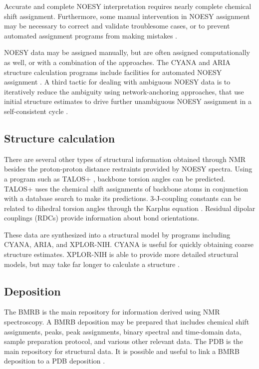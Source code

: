 Accurate and complete NOESY interpretation requires nearly complete chemical
shift assignment.  Furthermore, some manual intervention in NOESY assignment
may be necessary to correct and validate troublesome cases, or to prevent
automated assignment programs from making mistakes 
\cite{guntert2009automated, guerry2011automated}.

NOESY data may be assigned manually, but are often assigned computationally
as well, or with a combination of the approaches.  The CYANA and ARIA structure 
calculation programs include facilities for automated NOESY assignment
\cite{cyana2004, aria2003}.  
A third tactic for dealing with ambiguous NOESY data is to iteratively reduce the
ambiguity using network-anchoring approaches, that use initial structure 
estimates to drive further unambiguous NOESY assignment in a self-consistent
cycle \cite{cyana2004, aria2003}.

\subsection*{Structure calculation}

There are several other types of structural information obtained through NMR
besides the proton-proton distance restraints provided by NOESY spectra.
Using a program such as TALOS+ \cite{talos+}, backbone torsion angles can be 
predicted.  TALOS+
uses the chemical shift assignments of backbone atoms in conjunction with a
database search to make its predictions.  3-J-coupling constants can be 
related to dihedral torsion angles through the Karplus equation
\cite{karplus1959contact, karplus1963vicinal}.  Residual dipolar couplings
(RDCs) provide information about bond orientations.

These data are synthesized into a structural model by programs including CYANA,
ARIA, and XPLOR-NIH.  CYANA is useful for quickly obtaining coarse structure
estimates.  XPLOR-NIH is able to provide more detailed structural models, but
may take far longer to calculate a structure \cite{xplor-nih, cyana2004}.

\subsection*{Deposition}

The BMRB is the main repository for information derived using NMR spectroscopy.
A BMRB deposition may be prepared that includes chemical shift assignments,
peaks, peak assignments, binary spectral and time-domain data, sample 
preparation protocol, and various other relevant data.  The PDB is the main 
repository for structural data.  It is possible and useful to link a BMRB
deposition to a PDB deposition \cite{bmrb, pdb}.




